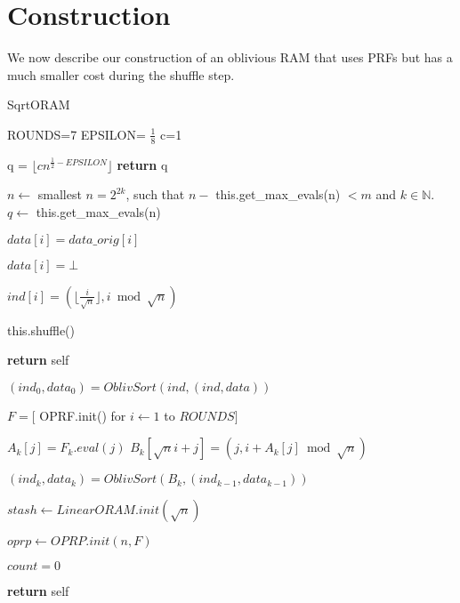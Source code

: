
\section{Construction}

We now describe our construction of an oblivious RAM that uses PRFs
but has a much smaller cost during the shuffle step.

\begin{algorithm}
\caption{SqrtORAM}
\label{alg:oram}
\begin{algorithmic}[1]

\State ROUNDS=7
\State EPSILON= $\frac{1}{8}$
\State c=1

\State

\State q = $\lfloor c n^{\frac{1}{2} - EPSILON} \rfloor$
\State \textbf{return} q
\EndProcedure

\State


\State $n \gets$ smallest $n= 2^{2k}$, such that $n - $ this.get\_max\_evals(n) $ < m$ and $k \in \mathbb{N}$.
\State $q \gets$ this.get\_max\_evals(n)

   \State $data[i] = data\_orig[i]$
\EndFor

   \State $data[i] = \bot$
\EndFor
   
    \State $ind[i]  = (\lfloor{ \frac{i}{\sqrt{n}}} \rfloor ,  i \bmod \sqrt{n}) $
\EndFor

\State this.shuffle()

\State \textbf{return} self
\EndProcedure

\State


\State $(ind_0, data_0) = OblivSort(ind, (ind, data))$ \label{line:first_sort}

\State $F = [$ OPRF.init() for $i \gets 1$ to $ROUNDS]$

        \State $A_k[j] = F_k.eval(j)$ \label{line:prf_eval}
            \State $B_k[\sqrt{n} i + j] = (j, i + A_k[j] \bmod \sqrt{n})$
        \EndFor
    \EndFor
 
    \State $(ind_k, data_k) = OblivSort(B_k, (ind_{k-1}, data_{k-1}))$
        \label{line:second_sort}
  
\EndFor

\State $stash \gets LinearORAM.init(\sqrt{n})$

\State $oprp \gets OPRP.init(n, F)$

\State $count = 0$

\State \textbf{return} self

\EndProcedure

\State


\end{algorithmic}
\end{algorithm}

